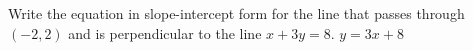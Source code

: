 {Write the equation in slope-intercept form for the line that passes through $(-2,2)$ and is perpendicular to the line $x+3y=8$.}
{$y=3x+8$}
